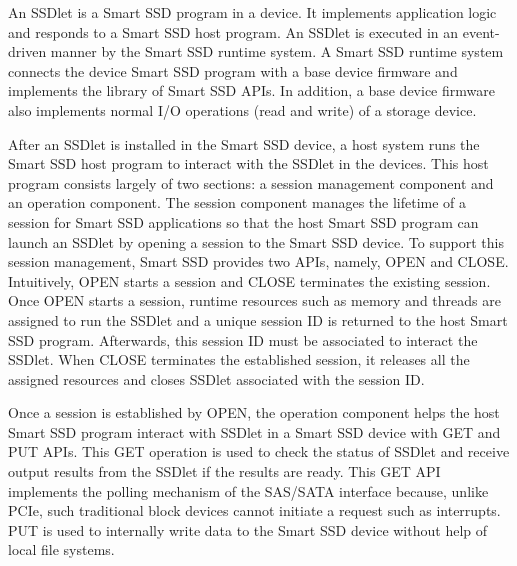 An SSDlet is a Smart SSD program in a device. It implements application logic and responds to a Smart SSD host program. An SSDlet is executed in an event-driven manner by the Smart SSD runtime system. A Smart SSD runtime system connects the device Smart SSD program with a base device firmware and implements the library of Smart SSD APIs. In addition, a base device firmware also implements normal I/O operations (read and write) of a storage device.

After an SSDlet is installed in the Smart SSD device, a host system runs the Smart SSD host program to interact with the SSDlet in the devices. This host program consists largely of two sections: a session management component and an operation component. The session component manages the lifetime of a session for Smart SSD applications so that the host Smart SSD program can launch an SSDlet by opening a session to the Smart SSD device. To support this session management, Smart SSD provides two APIs, namely, OPEN and CLOSE. Intuitively, OPEN starts a session and CLOSE terminates the existing session. Once OPEN starts a session, runtime resources such as memory and threads are assigned to run the SSDlet and a unique session ID is returned to the host Smart SSD program. Afterwards, this session ID must be associated to interact the SSDlet. When CLOSE terminates the established session, it releases all the assigned resources and closes SSDlet associated with the session ID.

Once a session is established by OPEN, the operation component helps the host Smart SSD program interact with SSDlet in a Smart SSD device with GET and PUT APIs. This GET operation is used to check the status of SSDlet and receive output results from the SSDlet if the results are ready. This GET API implements the polling mechanism of the SAS/SATA interface because, unlike PCIe, such traditional block devices cannot initiate a request such as interrupts. PUT is used to internally write data to the Smart SSD device without help of local file systems.


